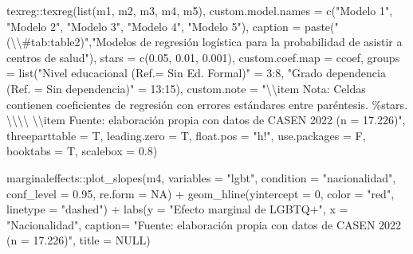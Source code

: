 \documentclass[
  12pt,
  a4paper,
]{article}
\newenvironment{Shaded}{\begin{snugshade}}{\end{snugshade}}
\newcommand{\AttributeTok}[1]{\textcolor[rgb]{0.77,0.63,0.00}{#1}}
\newcommand{\ConstantTok}[1]{\textcolor[rgb]{0.00,0.00,0.00}{#1}}
\newcommand{\DecValTok}[1]{\textcolor[rgb]{0.00,0.00,0.81}{#1}}
\newcommand{\FloatTok}[1]{\textcolor[rgb]{0.00,0.00,0.81}{#1}}
\newcommand{\FunctionTok}[1]{\textcolor[rgb]{0.00,0.00,0.00}{#1}}
\newcommand{\NormalTok}[1]{#1}
\newcommand{\OtherTok}[1]{\textcolor[rgb]{0.56,0.35,0.01}{#1}}
\newcommand{\SpecialCharTok}[1]{\textcolor[rgb]{0.00,0.00,0.00}{#1}}
\newcommand{\StringTok}[1]{\textcolor[rgb]{0.31,0.60,0.02}{#1}}
\begin{document}
\begin{Shaded}
\begin{Highlighting}[]
\NormalTok{texreg}\SpecialCharTok{::}\FunctionTok{texreg}\NormalTok{(}\FunctionTok{list}\NormalTok{(m1, m2, m3, m4, m5),}
               \AttributeTok{custom.model.names =} \FunctionTok{c}\NormalTok{(}\StringTok{"Modelo 1"}\NormalTok{, }\StringTok{"Modelo 2"}\NormalTok{, }\StringTok{"Modelo 3"}\NormalTok{, }\StringTok{"Modelo 4"}\NormalTok{, }\StringTok{"Modelo 5"}\NormalTok{),}
               \AttributeTok{caption =} \FunctionTok{paste}\NormalTok{(}\StringTok{"(}\SpecialCharTok{\textbackslash{}\textbackslash{}}\StringTok{\#tab:table2)"}\NormalTok{,}\StringTok{"Modelos de regresión logística para la probabilidad de asistir a centros de salud"}\NormalTok{),}
               \AttributeTok{stars =} \FunctionTok{c}\NormalTok{(}\FloatTok{0.05}\NormalTok{, }\FloatTok{0.01}\NormalTok{, }\FloatTok{0.001}\NormalTok{),}
               \AttributeTok{custom.coef.map =}\NormalTok{ ccoef,}
               \AttributeTok{groups =} \FunctionTok{list}\NormalTok{(}\StringTok{"Nivel educacional (Ref.= Sin Ed. Formal)"} \OtherTok{=} \DecValTok{3}\SpecialCharTok{:}\DecValTok{8}\NormalTok{,}
                            \StringTok{"Grado dependencia (Ref. = Sin dependencia)"} \OtherTok{=} \DecValTok{13}\SpecialCharTok{:}\DecValTok{15}\NormalTok{),}
               \AttributeTok{custom.note =} \StringTok{"}\SpecialCharTok{\textbackslash{}\textbackslash{}}\StringTok{item Nota: Celdas contienen coeficientes de regresión con errores estándares entre paréntesis. \%stars. }\SpecialCharTok{\textbackslash{}\textbackslash{}\textbackslash{}\textbackslash{}}\StringTok{ }\SpecialCharTok{\textbackslash{}\textbackslash{}}\StringTok{item Fuente: elaboración propia con datos de CASEN 2022 (n = 17.226)"}\NormalTok{,}
               \AttributeTok{threeparttable =}\NormalTok{ T,}
               \AttributeTok{leading.zero =}\NormalTok{ T,}
               \AttributeTok{float.pos =} \StringTok{"h!"}\NormalTok{,}
               \AttributeTok{use.packages =}\NormalTok{ F,}
               \AttributeTok{booktabs =}\NormalTok{ T,}
               \AttributeTok{scalebox =} \FloatTok{0.8}\NormalTok{)}


\NormalTok{marginaleffects}\SpecialCharTok{::}\FunctionTok{plot\_slopes}\NormalTok{(m4, }
                             \AttributeTok{variables =} \StringTok{"lgbt"}\NormalTok{, }
                             \AttributeTok{condition =} \StringTok{"nacionalidad"}\NormalTok{, }
                             \AttributeTok{conf\_level =} \FloatTok{0.95}\NormalTok{, }
                             \AttributeTok{re.form =} \ConstantTok{NA}\NormalTok{) }\SpecialCharTok{+}
  \FunctionTok{geom\_hline}\NormalTok{(}\AttributeTok{yintercept =} \DecValTok{0}\NormalTok{, }
             \AttributeTok{color =} \StringTok{"red"}\NormalTok{, }
             \AttributeTok{linetype =} \StringTok{"dashed"}\NormalTok{) }\SpecialCharTok{+}
  \FunctionTok{labs}\NormalTok{(}\AttributeTok{y =} \StringTok{"Efecto marginal de LGBTQ+"}\NormalTok{,}
       \AttributeTok{x =} \StringTok{"Nacionalidad"}\NormalTok{,}
      \AttributeTok{caption=} \StringTok{"Fuente: elaboración propia con datos de CASEN 2022 (n = 17.226)"}\NormalTok{,}
       \AttributeTok{title =} \ConstantTok{NULL}\NormalTok{)}



\end{Highlighting}
\end{Shaded}
\end{document}
